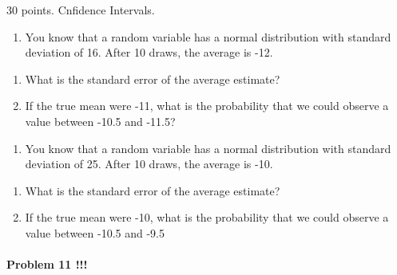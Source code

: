 \documentclass[]{article}
\providecommand{\tightlist}{%
  \setlength{\itemsep}{0pt}\setlength{\parskip}{0pt}}
\let\oldparagraph\paragraph
\renewcommand{\paragraph}[1]{\oldparagraph{#1}\mbox{}}
\begin{document}
30 points. Cnfidence Intervals.

\begin{enumerate}
\def\labelenumi{\arabic{enumi}.}
\setcounter{enumi}{60}
\tightlist
\item
  You know that a random variable has a normal distribution with
  standard deviation of 16. After 10 draws, the average is -12.
\end{enumerate}

\begin{enumerate}
\def\labelenumi{\alph{enumi}.}
\tightlist
\item
  What is the standard error of the average estimate?
\item
  If the true mean were -11, what is the probability that we could
  observe a value between -10.5 and -11.5?
\end{enumerate}

\begin{enumerate}
\def\labelenumi{\arabic{enumi}.}
\setcounter{enumi}{61}
\tightlist
\item
  You know that a random variable has a normal distribution with
  standard deviation of 25. After 10 draws, the average is -10.
\end{enumerate}

\begin{enumerate}
\def\labelenumi{\alph{enumi}.}
\tightlist
\item
  What is the standard error of the average estimate?
\item
  If the true mean were -10, what is the probability that we could
  observe a value between -10.5 and -9.5
\end{enumerate}

\paragraph{Problem 11 !!!}\label{problem-11}
\end{document}
